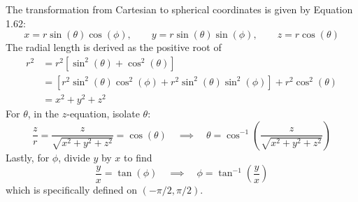 \documentclass[a4paper]{article}
\begin{document}
The transformation from Cartesian to spherical coordinates is given by Equation 1.62:
\[
	x = r \sin\!\left(\theta\right)\cos\!\left(\phi\right), \qquad y = r \sin\!\left(\theta\right)\sin\!\left(\phi\right), \qquad z = r \cos\!\left(\theta\right) 
\]
The radial length is derived as the positive root of
\begin{align*}
	r^{2} & = r^{2}\!\left[ \sin^{2}\!\left(\theta\right) + \cos^{2}\!\left(\theta\right) \right] \\ 
	      & = \!\left[ r^{2}\sin^{2}\!\left(\theta\right)\cos^{2}\!\left(\phi\right) + r^{2}\sin^{2}\!\left(\theta\right)\sin^{2}\!\left(\phi\right) \right] + r^{2}\cos^{2}\!\left(\theta\right) \\
	      & = x^{2} + y^{2} + z^{2}
\end{align*}
For \( \theta \), in the \( z \)-equation, isolate \( \theta \):
\[
	\frac{z}{r} = \frac{z}{\sqrt{x^{2} + y^{2} + z^{2}}} = \cos\!\left(\theta\right) \quad \implies \quad \theta = \cos^{-1}\!\left(\frac{z}{\sqrt{x^{2} + y^{2} + z^{2}}}\right) 
\]
Lastly, for \( \phi \), divide \( y \) by \( x \) to find
\[
	\frac{y}{x} = \tan\!\left(\phi\right) \quad \implies \quad \phi = \tan^{-1}\!\left(\frac{y}{x}\right)
\]
which is specifically defined on \( \!\left( -\pi / 2, \pi / 2 \right) \).

\vspace{12pt}

\end{document}

